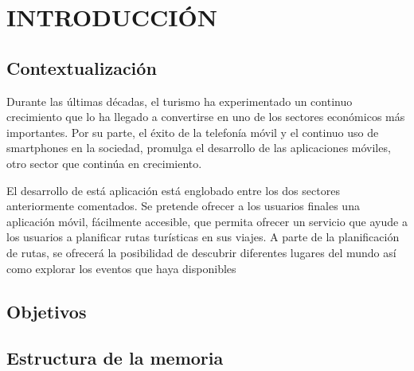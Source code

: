 \setcounter{page}{1}
\chapter[Introducción]{
  \label{chp:introduccion}
  INTRODUCCIÓN
}
\thispagestyle{numberingStyle}
\pagestyle{numberingStyle}


\section{Contextualización}
Durante las últimas décadas, el turismo ha experimentado un continuo crecimiento que lo ha llegado a convertirse en uno de los sectores económicos más importantes. Por su parte, el éxito de la telefonía móvil y el continuo uso de smartphones en la sociedad, promulga el desarrollo de las aplicaciones móviles, otro sector que continúa en crecimiento.

El desarrollo de está aplicación está englobado entre los dos sectores anteriormente comentados. Se pretende ofrecer a los usuarios finales una aplicación móvil, fácilmente accesible, que permita ofrecer un servicio que ayude a los usuarios a planificar rutas turísticas en sus viajes. A parte de la planificación de rutas, se ofrecerá la posibilidad de descubrir diferentes lugares del mundo así como explorar los eventos que haya disponibles 

\section{Objetivos}

\section{Estructura de la memoria}

